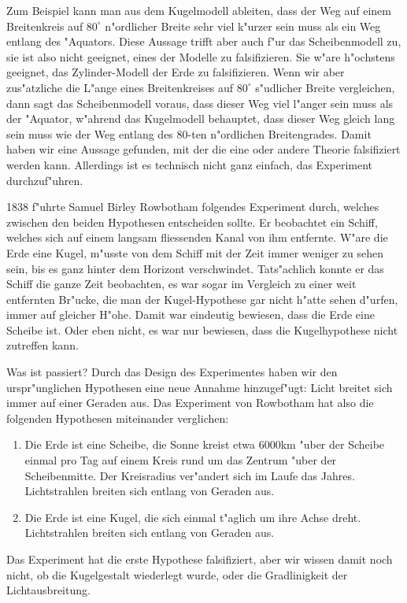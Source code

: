 Zum Beispiel kann man aus dem Kugelmodell ableiten, dass der Weg
auf einem Breitenkreis auf $80^\circ$ n"ordlicher Breite
sehr viel k"urzer sein muss als ein Weg entlang des "Aquators.
Diese Aussage trifft aber auch f"ur das Scheibenmodell zu, sie
ist also nicht geeignet, eines der Modelle zu falsifizieren.
Sie w"are h"ochstens geeignet, das Zylinder-Modell der Erde
zu falsifizieren.
Wenn wir aber zus"atzliche die L"ange eines Breitenkreises 
auf $80^\circ$ s"udlicher Breite vergleichen, dann sagt
das Scheibenmodell voraus, dass dieser Weg viel l"anger
sein muss als der "Aquator, w"ahrend das Kugelmodell behauptet,
dass dieser Weg gleich lang sein muss wie der Weg entlang des
$80$-ten n"ordlichen Breitengrades.
Damit haben wir eine Aussage gefunden, mit der die eine oder andere
Theorie falsifiziert werden kann.
Allerdings ist es technisch nicht ganz einfach, das Experiment
durchzuf"uhren.

1838 f"uhrte Samuel Birley Rowbotham folgendes Experiment durch,
welches zwischen den beiden Hypothesen entscheiden sollte.
Er beobachtet ein Schiff, welches sich auf einem langsam fliessenden
Kanal von ihm entfernte.
W"are die Erde eine Kugel, m"usste von dem Schiff mit der Zeit
immer weniger zu sehen sein, bis es ganz hinter dem Horizont
verschwindet.
Tats"achlich konnte er das Schiff die ganze Zeit beobachten, es
war sogar im Vergleich zu einer weit entfernten Br"ucke, die
man der Kugel-Hypothese gar nicht h"atte sehen d"urfen, immer auf
gleicher H"ohe.
Damit war eindeutig bewiesen, dass die Erde eine Scheibe ist.
Oder eben nicht, es war nur bewiesen, dass die Kugelhypothese
nicht zutreffen kann.

Was ist passiert? 
Durch das Design des Experimentes haben wir den urspr"unglichen
Hypothesen eine neue Annahme hinzugef"ugt: Licht breitet sich
immer auf einer Geraden aus.
Das Experiment von Rowbotham hat also die folgenden Hypothesen miteinander
verglichen:
\begin{enumerate}
\item Die Erde ist eine Scheibe, die Sonne kreist etwa 6000km "uber der
Scheibe einmal pro Tag auf einem Kreis rund um das Zentrum "uber der
Scheibenmitte. 
Der Kreisradius ver"andert sich im Laufe das Jahres.
Lichtstrahlen breiten sich entlang von Geraden aus.
\item Die Erde ist eine Kugel, die sich einmal t"aglich um ihre
Achse dreht.
Lichtstrahlen breiten sich entlang von Geraden aus.
\end{enumerate}
Das Experiment hat die erste Hypothese falsifiziert, aber wir wissen
damit noch nicht, ob die Kugelgestalt wiederlegt wurde, oder die
Gradlinigkeit der Lichtausbreitung.

